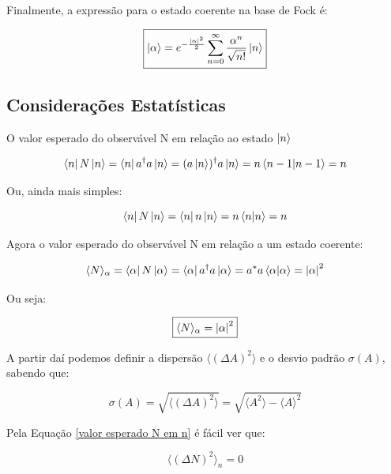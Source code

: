 \documentclass[12pt,a4paper]{report}
\begin{document}
Finalmente, a expressão para o estado coerente na base de Fock é:

\begin{equation}
   \boxed{\ket{\alpha}=e^{-\frac{\abs{\alpha}^2}{2}}\sum_{n=0}^{\infty}\frac{\alpha^n}{\sqrt{n!}}\ket{n}}
    \label{estado coerente na base de fock}
\end{equation} 

\subsection{Considerações Estatísticas}\label{considerações estatísticas}

O valor esperado do observável N em relação ao estado $\ket{n}$

\begin{equation*}
    \bra{n}N\ket{n}=\bra{n}a^{\dag}a\ket{n}=(a\ket{n})^{\dag}a\ket{n}=n\braket{n-1}{n-1}=n
\end{equation*}

Ou, ainda mais simples:

\begin{equation}
    \bra{n}N\ket{n}=\bra{n}n\ket{n}=n\braket{n}{n}=n
    \label{valor esperado N em n}
\end{equation}

Agora o valor esperado do observável N em relação a um estado coerente:

\begin{equation*}
    \langle N \rangle_\alpha=\bra{\alpha}N\ket{\alpha}=\bra{\alpha}a^{\dag}a\ket{\alpha}=a^*a\braket{\alpha}{\alpha}=\abs{\alpha}^2
\end{equation*}

Ou seja:

\begin{equation}
    \boxed{\langle N \rangle_\alpha=\abs{\alpha}^2}
    \label{valor esperado N em alpha}
\end{equation}

A partir daí podemos definir a dispersão $\langle(\Delta A)^2\rangle$ e o desvio padrão $\sigma(A)$, sabendo que:

\begin{equation}
    \sigma(A)=\sqrt{\langle(\Delta A)^2\rangle}=\sqrt{\langle A^2\rangle-\langle A \rangle^2}
\end{equation}

Pela Equação \ref{valor esperado N em n} é fácil ver que:

\begin{equation}
    \langle(\Delta N)^2\rangle_n=0
\end{equation}
\end{document}
